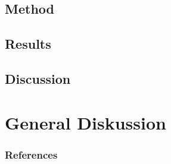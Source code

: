 \documentclass{beamer}					%
\begin{document}
\subsection{Method}
\subsection{Results}


\subsection{Discussion}
\section{General Diskussion}

\begin{frame}[allowframebreaks]				%
\frametitle{References}

\end{frame}
\end{document}
